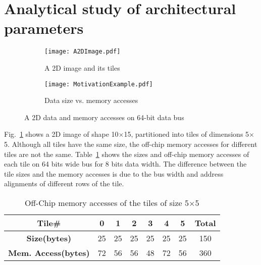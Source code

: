 \section{Analytical study of architectural parameters}\label{sec:OffChipAccessModel}
\begin{figure}[!htb]
	\centering
	\captionsetup{font=sf}
	\begin{subfigure}[t]{0.45\textwidth}
		\centering
		\texttt{[image: A2DImage.pdf]}
		\caption{A 2D image and its tiles}
		\label{fig:A2DImage}
	\end{subfigure}
	\hfil
	\begin{subfigure}[t]{0.4\textwidth}
		\centering
		\texttt{[image: MotivationExample.pdf]}
		\caption{Data size vs. memory accesses}
		\label{fig:bitPerPixelEffect}
	\end{subfigure}		
	\caption{A 2D data and memory accesses on 64-bit data bus}
	\label{fig:2DPartitionedData}
	\vspace{-1.0em}	
\end{figure}
Fig.~\ref{fig:A2DImage} shows a 2D image of shape 10$\times$15, partitioned into tiles of dimensions 5$\times$5. Although all tiles have the same size, the off-chip memory accesses for different tiles are not the same. Table~\ref{tab:TileOffChipAccesses} shows the sizes and off-chip memory accesses of each tile on 64 bits wide bus for 8 bits data width. The difference between the tile sizes and the memory accesses is due to the bus width and address alignments of different rows of the tile. 
\begin{table}[h]
	\centering
	\caption{Off-Chip memory accesses of the tiles of size 5$\times$5 }
	\begin{tabular}{|c|c|c|c|c|c|c|c|}
		\hline
		\textbf{Tile\#}& 0  & 1  & 2  & 3  & 4  & 5  & \textbf{Total} \\ \hline
		\textbf{Size(bytes)}& 25 & 25 & 25 & 25 & 25 & 25 & 150   \\ \hline
		\textbf{Mem. Access(bytes)} & 72 & 56 & 56 & 48 & 72 & 56 & 360  \\
		\hline
	\end{tabular}
	\label{tab:TileOffChipAccesses}
\end{table}

